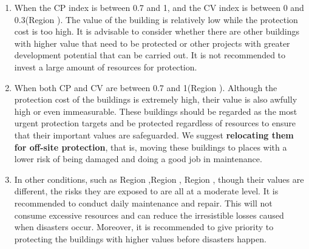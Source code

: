 \documentclass[12pt]{article}
\begin{document}
\begin{enumerate}
	\item When the CP index is between 0.7 and 1, and the CV index is between 0 and 0.3(Region \uppercase\expandafter{}). The value of the building is relatively low while the protection cost is too high. It is advisable to consider whether there are other buildings with higher value that need to be protected or other projects with greater development potential that can be carried out. It is not recommended to invest a large amount of resources for protection. 
	\item When both CP and CV are between 0.7 and 1(Region \uppercase\expandafter{}). Although the protection cost of the buildings is extremely high, their value is also awfully high or even immeasurable. These buildings should be regarded as the most urgent protection targets and be protected regardless of resources to ensure that their important values are safeguarded. We suggest \textbf{relocating them for off-site protection}, that is, moving these buildings to places with a lower risk of being damaged and doing a good job in maintenance. 
	\item In other conditions, such as Region \uppercase\expandafter{},Region \uppercase\expandafter{}, Region \uppercase\expandafter{}, though their values are different, the risks they are exposed to are all at a moderate level. It is recommended to conduct daily maintenance and repair. This will not consume excessive resources and can reduce the irresistible losses caused when disasters occur. Moreover, it is recommended to give priority to protecting the buildings with higher values before disasters happen. 
\end{enumerate}
\end{document}
